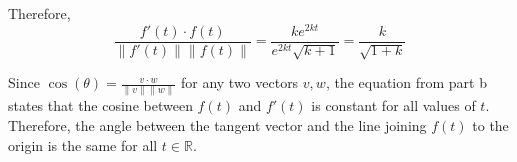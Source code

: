 \documentclass{report}
\begin{document}
\begin{enumerate}
	Therefore, 
	\[
		\frac{f'(t)\cdot f(t)}{\|f'(t)\|\|f(t)\|} =
		\frac{ke^{2kt}}{e^{2kt}\sqrt{k+1}} =
		\frac{k}{\sqrt{1+k}}
	\]

	Since $\cos(\theta) = \frac{v\cdot w}{\|v\|\|w\|}$ for any two vectors $v, w$,
	the equation from part b states that the cosine between 
	$f(t)$ and $f'(t)$ is constant for all values of $t$.
	Therefore, the angle between the tangent vector and the line joining 
	$f(t)$ to the origin is the same for all $t \in \mathbb{R}$.
\end{enumerate}
\end{document}
